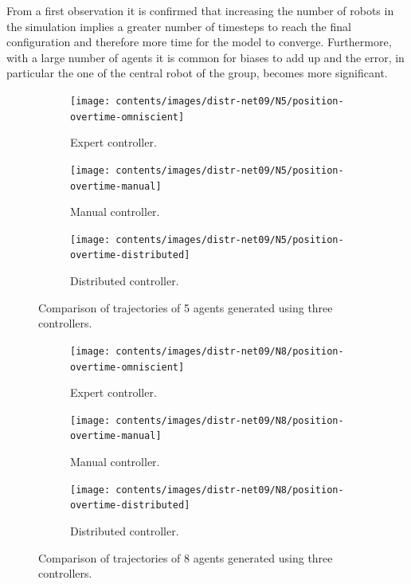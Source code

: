 From a first observation it is confirmed that increasing the number of robots in 
the simulation implies a greater number of timesteps to reach the final 
configuration and therefore more time for the model to converge.
Furthermore, with a large number of agents it is common for biases to add up 
and the error, in particular the one of the central robot of the group, becomes 
more significant.
\begin{figure}[!htb]
	\begin{center}
		\begin{subfigure}[h]{0.325\textwidth}
			\centering
			\texttt{[image: contents/images/distr-net09/N5/position-overtime-omniscient]}%
			\caption{Expert controller.}
		\end{subfigure}
		\hfill
	\begin{subfigure}[h]{0.325\textwidth}
		\centering
		\texttt{[image: contents/images/distr-net09/N5/position-overtime-manual]}%
		\caption{Manual controller.}
	\end{subfigure}
	\hfill
	\begin{subfigure}[h]{0.325\textwidth}
		\centering
		\texttt{[image: contents/images/distr-net09/N5/position-overtime-distributed]}
		\caption{Distributed controller.}
	\end{subfigure}
\end{center}
	\caption[Evaluation of the trajectories learned by \texttt{net-09} using 5 
	agents.]{Comparison of trajectories of 5 agents generated using three 
	controllers.}
	\label{fig:net09traj5}
\end{figure}
\begin{figure}[!htb]
	\begin{center}
		\begin{subfigure}[h]{0.325\textwidth}
			\centering
			\texttt{[image: contents/images/distr-net09/N8/position-overtime-omniscient]}%
			\caption{Expert controller.}
		\end{subfigure}
		\hfill
	\begin{subfigure}[h]{0.325\textwidth}
		\centering
		\texttt{[image: contents/images/distr-net09/N8/position-overtime-manual]}%
		\caption{Manual controller.}
	\end{subfigure}
	\hfill
	\begin{subfigure}[h]{0.325\textwidth}
		\centering
		\texttt{[image: contents/images/distr-net09/N8/position-overtime-distributed]}
		\caption{Distributed controller.}
	\end{subfigure}
\end{center}
	\caption[Evaluation of the trajectories learned by \texttt{net-09} using 8 
	agents.]{Comparison of trajectories of 8 agents generated using three 
	controllers.}
	\label{fig:net09traj8}
\end{figure}
